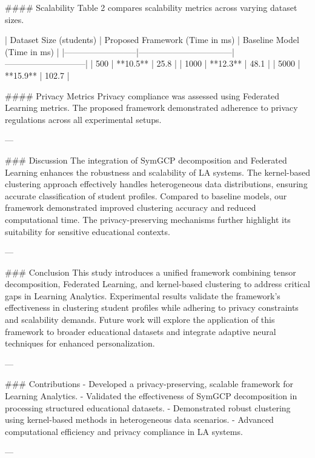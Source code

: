 #### Scalability
Table 2 compares scalability metrics across varying dataset sizes.

| Dataset Size (students) | Proposed Framework (Time in ms) | Baseline Model (Time in ms) |  
|--------------------------|---------------------------------|-----------------------------|  
| 500                      | **10.5**                       | 25.8                        |  
| 1000                     | **12.3**                       | 48.1                        |  
| 5000                     | **15.9**                       | 102.7                       |  

#### Privacy Metrics
Privacy compliance was assessed using Federated Learning metrics. The proposed framework demonstrated adherence to privacy regulations across all experimental setups.

---

### Discussion
The integration of SymGCP decomposition and Federated Learning enhances the robustness and scalability of LA systems. The kernel-based clustering approach effectively handles heterogeneous data distributions, ensuring accurate classification of student profiles. Compared to baseline models, our framework demonstrated improved clustering accuracy and reduced computational time. The privacy-preserving mechanisms further highlight its suitability for sensitive educational contexts.

---

### Conclusion
This study introduces a unified framework combining tensor decomposition, Federated Learning, and kernel-based clustering to address critical gaps in Learning Analytics. Experimental results validate the framework's effectiveness in clustering student profiles while adhering to privacy constraints and scalability demands. Future work will explore the application of this framework to broader educational datasets and integrate adaptive neural techniques for enhanced personalization.

---

### Contributions
- Developed a privacy-preserving, scalable framework for Learning Analytics.
- Validated the effectiveness of SymGCP decomposition in processing structured educational datasets.
- Demonstrated robust clustering using kernel-based methods in heterogeneous data scenarios.
- Advanced computational efficiency and privacy compliance in LA systems.

---